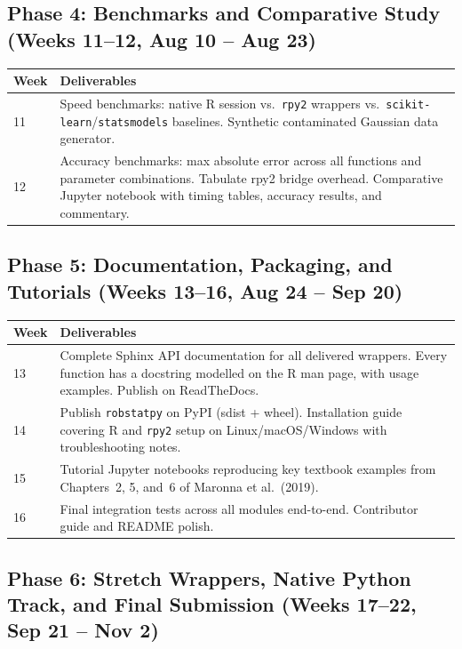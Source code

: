 \documentclass[11pt, a4paper]{article}
\begin{document}
\subsection{Phase 4: Benchmarks and Comparative Study (Weeks 11--12, Aug 10 -- Aug 23)}

\begin{tabularx}{\linewidth}{@{} l X @{}}
  \toprule
  \textbf{Week} & \textbf{Deliverables} \\
  \midrule
  11 & Speed benchmarks: native R session vs.\ \texttt{rpy2} wrappers vs.\
     \texttt{scikit-learn}/\texttt{statsmodels} baselines.
     Synthetic contaminated Gaussian data generator. \\
  12 & Accuracy benchmarks: max absolute error across all functions
     and parameter combinations. Tabulate rpy2 bridge overhead.
     Comparative Jupyter notebook with timing tables, accuracy
     results, and commentary. \\
  \bottomrule
\end{tabularx}

\subsection{Phase 5: Documentation, Packaging, and Tutorials (Weeks 13--16, Aug 24 -- Sep 20)}

\begin{tabularx}{\linewidth}{@{} l X @{}}
  \toprule
  \textbf{Week} & \textbf{Deliverables} \\
  \midrule
  13 & Complete Sphinx API documentation for all delivered wrappers.
     Every function has a docstring modelled on the R man page,
     with usage examples. Publish on ReadTheDocs. \\
  14 & Publish \texttt{robstatpy} on PyPI (sdist + wheel).
     Installation guide covering R and \texttt{rpy2} setup on
     Linux/macOS/Windows with troubleshooting notes. \\
  15 & Tutorial Jupyter notebooks reproducing key textbook examples
     from Chapters~2, 5, and~6 of Maronna et al.\ (2019). \\
  16 & Final integration tests across all modules end-to-end.
     Contributor guide and README polish. \\
  \bottomrule
\end{tabularx}

\subsection{Phase 6: Stretch Wrappers, Native Python Track, and Final Submission (Weeks 17--22, Sep 21 -- Nov 2)}
\end{document}
